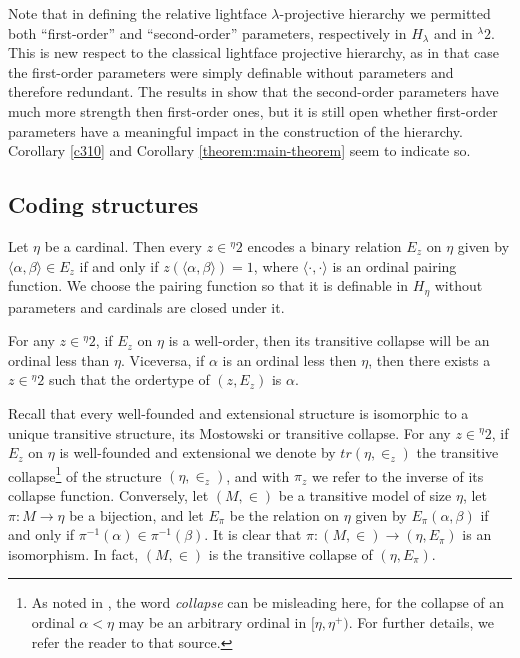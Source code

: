 \documentclass{amsart}
\numberwithin{equation}{section}
\theoremstyle{definition}
\theoremstyle{remark}
\begin{document}
    Note that in defining the relative lightface $\lambda$-projective hierarchy we permitted both ``first-order'' and ``second-order'' parameters, respectively in $H_\lambda$ and in ${}^\lambda 2$. This is new respect to the classical lightface projective hierarchy, as in that case the first-order parameters were simply definable without parameters and therefore redundant. The results in \cite{dimonte2023descriptive} show that the second-order parameters have much more strength then first-order ones, but it is still open whether first-order parameters have a meaningful impact in the construction of the hierarchy. Corollary \ref{c310} and Corollary \ref{theorem:main-theorem} seem to indicate so.
	





 \subsection{Coding structures} Let $\eta$ be a cardinal. Then every $z\in{}^{\eta}2$ encodes a binary relation $E_{z}$ on $\eta$ given by $\langle\alpha,\beta\rangle\in E_{z}$ if and only if $z(\langle\alpha,\beta\rangle)=1$, where $\langle\cdot , \cdot\rangle$ is an ordinal pairing function. We choose the pairing function so that it is definable in $H_\eta$ without parameters and cardinals are closed under it.

 For any $z\in{}^{\eta}2$, if $E_z$ on $\eta$ is a well-order, then its transitive collapse will be an ordinal less than $\eta$. Viceversa, if $\alpha$ is an ordinal less then $\eta$, then there exists a $z\in{}^{\eta}2$ such that the ordertype of $(z,E_z)$ is $\alpha$.

 Recall that every well-founded and extensional structure is isomorphic to a unique transitive structure, its Mostowski or transitive collapse. For any $z\in{}^{\eta}2$, if $E_z$ on $\eta$ is well-founded and extensional we denote by $tr(\eta,\in_{z})$ the transitive collapse\footnote{As noted in \cite[Remark 7.2.3]{DMR}, the word \emph{collapse} can be misleading here, for the collapse of an ordinal $\alpha < \eta$ may be an arbitrary ordinal in $[\eta, \eta^+)$. For further details, we refer the reader to that source.} of the structure $(\eta,\in_{z})$, and with $\pi_{z}$ we refer to the inverse of its collapse function.
Conversely, let $(M,\in)$ be a transitive model of size $\eta$, let $\pi:M\to\eta$ be a bijection, and let $E_{\pi}$ be the relation on $\eta$ given by $E_{\pi}(\alpha,\beta)$ if and only if $\pi^{-1}(\alpha)\in \pi^{-1}(\beta)$. It is clear that $\pi:(M,\in)\to(\eta,E_{\pi})$ is an isomorphism. In fact, $(M,\in)$ is the transitive collapse of $(\eta,E_{\pi})$. 
 
\end{document}
